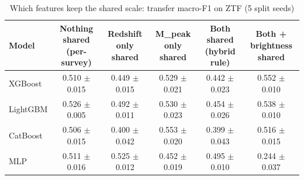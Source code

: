 \begin{table}
\centering
\caption{Which features keep the shared scale: transfer macro-F1 on ZTF (5 split seeds)}
\begin{tabular}{lccccc}
\hline
Model & Nothing shared (per-survey) & Redshift only shared & M\_peak only shared & Both shared (hybrid rule) & Both + brightness shared \\
\hline
XGBoost & 0.510 $\pm$ 0.015 & 0.449 $\pm$ 0.015 & 0.529 $\pm$ 0.021 & 0.442 $\pm$ 0.023 & 0.552 $\pm$ 0.010 \\
LightGBM & 0.526 $\pm$ 0.005 & 0.492 $\pm$ 0.011 & 0.530 $\pm$ 0.023 & 0.454 $\pm$ 0.026 & 0.538 $\pm$ 0.010 \\
CatBoost & 0.506 $\pm$ 0.015 & 0.400 $\pm$ 0.042 & 0.553 $\pm$ 0.020 & 0.399 $\pm$ 0.043 & 0.516 $\pm$ 0.015 \\
MLP & 0.511 $\pm$ 0.016 & 0.525 $\pm$ 0.012 & 0.452 $\pm$ 0.019 & 0.495 $\pm$ 0.010 & 0.244 $\pm$ 0.037 \\
\hline
\end{tabular}
\end{table}
